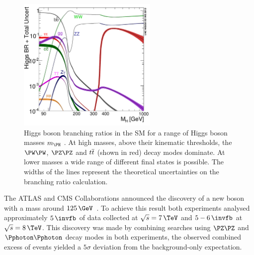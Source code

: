 \begin{figure}[!htb]
 \includegraphics[width=0.6\textwidth]{Chapter01/Images/Higgs_BR.pdf}
\caption[Higgs boson branching ratios in the SM for a range of Higgs boson
masses.]{Higgs boson branching ratios in the SM for a range of Higgs boson
masses $m_{\PH}$ \cite{ARTICLE:HandbookofLHCHiggsCrossSectionsHiggsProperties}. At high masses, above their
kinematic thresholds, the $\PW\PW$,
$\PZ\PZ$ and $t\overline{t}$ (shown in red) decay modes dominate. 
At lower masses a wide range of different final states is possible. 
The widths of the lines represent the
theoretical uncertainties on the branching ratio calculation.}
\label{FIGURE:Theory_SM_SearchingSMHiggs_SMHiggsBRs}
\end{figure}

The ATLAS and CMS Collaborations announced the discovery of a new boson with a mass around $125\,\GeV$~\cite{ARTICLE:CMS_HiggsDiscovery,ARTICLE:ATLAS_HiggsDiscovery}. To achieve this result both experiments analysed approximately $5\,\invfb$ of data collected at $\sqrt{s}=7\,\TeV$ and $5-6\,\invfb$ at $\sqrt{s}=8\,\TeV$. This discovery was made by combining searches using $\PZ\PZ$ and $\Pphoton\Pphoton$ decay modes in both experiments, the observed combined excess of events yielded a $5\sigma$ deviation from the background-only expectation.

